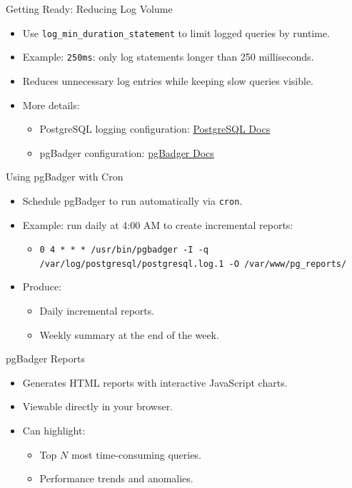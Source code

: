 \documentclass[aspectratio=169]{beamer}
\begin{document}
\begin{frame}{Getting Ready: Reducing Log Volume}
\begin{itemize}
    \item Use \texttt{log\_min\_duration\_statement} to limit logged queries by runtime.
    \item Example: \texttt{250ms}: only log statements longer than 250 milliseconds.
    \item Reduces unnecessary log entries while keeping slow queries visible.
    \item More details:
     \begin{itemize}
         \item PostgreSQL logging configuration: \href{https://www.postgresql.org/docs/current/runtime-config-logging.html}{PostgreSQL Docs}
         \item pgBadger configuration: \href{https://pgbadger.darold.net/documentation.html}{pgBadger Docs}
     \end{itemize}
\end{itemize}
\end{frame}

\begin{frame}{Using pgBadger with Cron}
\begin{itemize}
    \item Schedule pgBadger to run automatically via \texttt{cron}.
    \item Example: run daily at 4:00 AM to create incremental reports:
    \begin{itemize}
        \item \texttt{0 4 * * * /usr/bin/pgbadger -I -q /var/log/postgresql/postgresql.log.1 -O /var/www/pg\_reports/}
    \end{itemize}
    \item Produce:
    \begin{itemize}
        \item Daily incremental reports.
        \item Weekly summary at the end of the week.
    \end{itemize}
\end{itemize}
\end{frame}

\begin{frame}{pgBadger Reports}
\begin{itemize}
    \item Generates HTML reports with interactive JavaScript charts.
    \item Viewable directly in your browser.
    \item Can highlight:
    \begin{itemize}
        \item Top \(N\) most time-consuming queries.
        \item Performance trends and anomalies.
    \end{itemize}
\end{itemize}
\end{frame}
\end{document}
